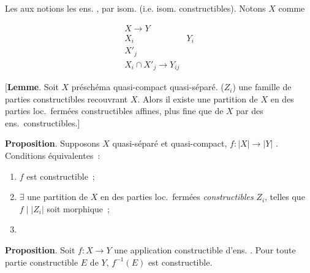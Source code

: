 \documentclass[11pt,a4paper]{article}
\begin{document}

Les   aux notions  les
ens. ,   \ill{} par isom.
   (i.e. isom. constructibles).
Notons $X$ comme \ill{}

\[
\begin{array}{ll}
X \to Y & \\
X_i & Y_i \\
X'_j & \\
X_i \cap X'_j \to Y_{ij} &
\end{array}
\]

[\textbf{Lemme}. Soit $X$ préschéma quasi-compact quasi-séparé.
 ($Z_i$) une famille  de parties
constructibles recouvrant $X$. Alors il existe une
partition de $X$ en des parties loc.\ fermées constructibles affines,
plus fine que   \struck{\ill{}} de $X$ par des ens.\ constructibles.]

\textbf{Proposition}. Supposons $X$ quasi-séparé et quasi-compact, $f \colon |X| \to |Y|$ .
Conditions équivalentes~:
\begin{enumerate}
  \item[(i)] $f$ est constructible~;
  \item[(ii)] $\exists$ une partition  de $X$ en des parties loc.\ fermées \emph{constructibles}  $Z_i$,
  telles que $f \mid |Z_i|$ soit morphique~;
  \item[(iii)] 
\end{enumerate}

\textbf{Proposition}. Soit $f \colon X \to Y$  une application constructible
d'ens. . Pour toute partie constructible
$E$ de $Y$, $f^{-1}(E)$ est constructible.

\end{document}
